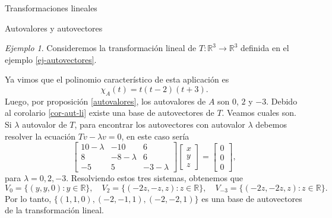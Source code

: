 \documentclass[a4paper,12pt,twoside,spanish,reqno]{amsbook}
\numberwithin{equation}{section}
\theoremstyle{definition}
\theoremstyle{remark}
\newtheorem*{ejemplo*}{Ejemplo}
\newcommand{\R}{\mathbb R}
\begin{document}
\begin{chapter}{Transformaciones lineales}
\begin{section}{Autovalores y autovectores}
        \begin{ejemplo*} Consideremos la transformación lineal de $T:\R^3\to\R^3$  definida en el ejemplo \ref{ej-autovectores}.

        Ya vimos que  el  polinomio característico de esta aplicación es 
        $$
        \chi_A(t) = t (t-2)(t+3).
        $$
        Luego, por 	proposición \ref{autovalores}, los autovalores de $A$ son $0$, $2$ y $-3$. Debido al corolario \ref{cor-aut-li} existe una base de autovectores de $T$. Veamos cuales son. Si $\lambda$ autovalor de $T$, para encontrar los autovectores con autovalor $\lambda$  debemos resolver la ecuación $Tv -\lambda v=0 $,  en este caso sería
        \begin{equation*}
        \begin{bmatrix}10- \lambda &-10&6\\8& -8- \lambda & 6\\-5& 5& -3- \lambda \end{bmatrix}
        \begin{bmatrix} x\\y\\z \end{bmatrix} =
        \begin{bmatrix} 0\\0 \\0\end{bmatrix},
        \end{equation*}  
        para $\lambda =0, 2,-3$. Resolviendo estos tres sistemas, obtenemos que 
        \begin{equation*}
            V_0 = \{(y,y,0): y \in \R \},\quad V_2 = \{(-2z,-z,z): z \in \R \},\quad V_{-3} = \{(-2z,-2z,z): z \in \R \}. 
        \end{equation*}
        Por lo tanto, $\{(1,1,0), (-2,-1,1), (-2,-2,1)\}$ es una base de autovectores de la transformación lineal. 
        \end{ejemplo*}
        

\end{section}
\end{chapter}
\end{document}
